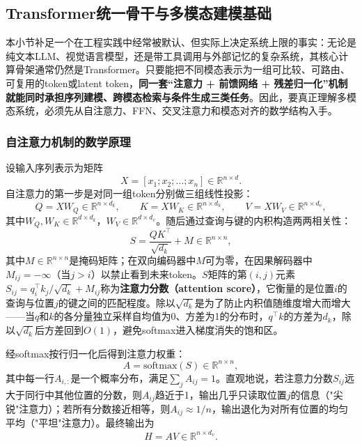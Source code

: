 \documentclass[12pt,a4paper]{article}
\begin{document}
\subsection{Transformer统一骨干与多模态建模基础}

本小节补足一个在工程实践中经常被默认、但实际上决定系统上限的事实：无论是纯文本LLM、视觉语言模型，还是带工具调用与外部记忆的复杂系统，其核心计算骨架通常仍然是Transformer。只要能把不同模态表示为一组可比较、可路由、可复用的token或latent token，\textbf{同一套“注意力 + 前馈网络 + 残差归一化”机制就能同时承担序列建模、跨模态检索与条件生成三类任务}。因此，要真正理解多模态系统，必须先从自注意力、FFN、交叉注意力和模态对齐的数学结构入手。

\subsubsection{自注意力机制的数学原理}

设输入序列表示为矩阵
\begin{equation}
X = [x_1; x_2; \ldots; x_n] \in \mathbb{R}^{n \times d}.
\end{equation}
自注意力的第一步是对同一组token分别做三组线性投影：
\begin{equation}
Q = XW_Q \in \mathbb{R}^{n \times d_k},\qquad K = XW_K \in \mathbb{R}^{n \times d_k},\qquad V = XW_V \in \mathbb{R}^{n \times d_v},
\end{equation}
其中$W_Q, W_K \in \mathbb{R}^{d \times d_k}$，$W_V \in \mathbb{R}^{d \times d_v}$。随后通过查询与键的内积构造两两相关性：
\begin{equation}
S = \frac{QK^\top}{\sqrt{d_k}} + M \in \mathbb{R}^{n \times n},
\end{equation}
其中$M \in \mathbb{R}^{n \times n}$是掩码矩阵；在双向编码器中$M$可为零，在因果解码器中$M_{ij}=-\infty$（当$j>i$）以禁止看到未来token。$S$矩阵的第$(i,j)$元素$S_{ij} = q_i^\top k_j / \sqrt{d_k} + M_{ij}$称为\textbf{注意力分数（attention score）}，它衡量的是位置$i$的查询与位置$j$的键之间的匹配程度。除以$\sqrt{d_k}$是为了防止内积值随维度增大而增大——当$q$和$k$的各分量独立采样自均值为0、方差为1的分布时，$q^\top k$的方差为$d_k$，除以$\sqrt{d_k}$后方差回到$O(1)$，避免softmax进入梯度消失的饱和区。

经softmax按行归一化后得到注意力权重：
\begin{equation}
A = \text{softmax}(S) \in \mathbb{R}^{n \times n},
\end{equation}
其中每一行$A_{i,:}$是一个概率分布，满足$\sum_j A_{ij}=1$。直观地说，若注意力分数$S_{ij}$远大于同行中其他位置的分数，则$A_{ij}$趋近于1，输出几乎只读取位置$j$的信息（"尖锐"注意力）；若所有分数接近相等，则$A_{ij} \approx 1/n$，输出退化为对所有位置的均匀平均（"平坦"注意力）。最终输出为
\begin{equation}
H = AV \in \mathbb{R}^{n \times d_v}.
\end{equation}
\end{document}
